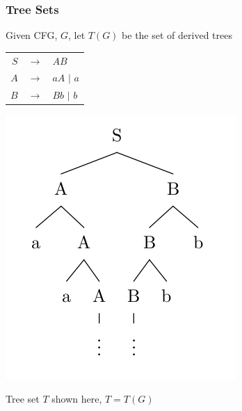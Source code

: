 \documentclass[compress,color=usenames]{beamer}
\begin{document}
\begin{frame}
\frametitle{Tree Sets} 

Given CFG, $G$, let $T(G)$ be the set of derived trees

\begin{center}
\begin{tabular}{rcl}
$S$ & $\rightarrow$ & $AB$\\
$A$ & $\rightarrow$ & $aA$ $\mid$ $a$\\
$B$ & $\rightarrow$ & $Bb$ $\mid$ $b$
\end{tabular}
\end{center}

\begin{center}
\includegraphics[scale=.3]{pics/pic2-3.jpg}
\end{center}


Tree set $T$ shown here, $T = T(G)$
\end{frame}

















\end{document}
